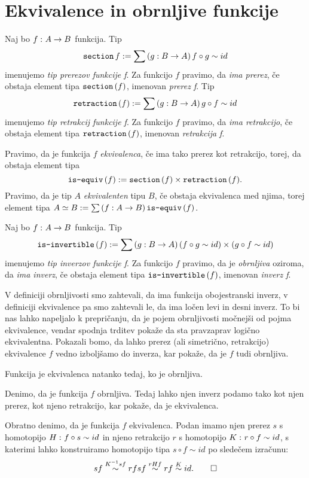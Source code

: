 \section{Ekvivalence in obrnljive funkcije}
\begin{definicija}
  Naj bo \(f \,\colon A \to B\) funkcija. Tip
  \[\textnormal{\texttt{section}}\, f := \sum \left( g : B \to A \right) f \circ g \sim id\]
  imenujemo \emph{tip prerezov funkcije f}. Za funkcijo \(f\) pravimo, da
  \emph{ima prerez}, če obstaja element tipa \(\textnormal{\texttt{section}}\,(f)\), imenovan \emph{prerez f}.
  Tip \[\textnormal{\texttt{retraction}}\,(f) := \sum \left( g : B \to A \right) g \circ f \sim id\] imenujemo
  \emph{tip retrakcij funkcije f}. Za funkcijo \(f\) pravimo, da \emph{ima retrakcijo}, če
  obstaja element tipa \(\textnormal{\texttt{retraction}}\,(f)\), imenovan \emph{retrakcija f}.
\end{definicija}

\begin{definicija}
  Pravimo, da je funkcija \(f\) \emph{ekvivalenca}, če ima tako prerez kot retrakcijo,
  torej, da obstaja element tipa \[\textnormal{\texttt{is-equiv}}\,(f) := \textnormal{\texttt{section}}\,(f) \times \textnormal{\texttt{retraction}}\,(f).\]
  Pravimo, da je tip \(A\) \emph{ekvivalenten} tipu \(B\), če obstaja ekvivalenca med
  njima, torej element tipa \(A \simeq B := \sum \left( f : A \to B \right) \textnormal{\texttt{is-equiv}}\,(f)\).
\end{definicija}

\begin{definicija}
  Naj bo \(f \,\colon A \to B\) funkcija. Tip
  \[\textnormal{\texttt{is-invertible}}\,(f) := \sum \left( g : B \to A \right) (f \circ g \sim id) \times (g \circ f \sim id)\]
  imenujemo \emph{tip inverzov funkcije f}. Za funkcijo \(f\) pravimo, da je
  \emph{obrnljiva} oziroma, da \emph{ima inverz}, če obstaja element tipa
  \(\textnormal{\texttt{is-invertible}}\,(f)\), imenovan \emph{inverz f}.
\end{definicija}

V definiciji obrnljivosti smo zahtevali, da ima funkcija obojestranski inverz, v
definiciji ekvivalence pa smo zahtevali le, da ima ločen levi in desni inverz.
To bi nas lahko
napeljalo k prepričanju, da je pojem obrnljivosti močnejši od pojma ekvivalence, vendar
spodnja trditev pokaže da sta pravzaprav logično ekvivalentna. Pokazali bomo, da lahko
prerez (ali simetrično, retrakcijo) ekvivalence \(f\) vedno izboljšamo do inverza,
kar pokaže, da je \(f\) tudi obrnljiva.

\begin{trditev}
  Funkcija je ekvivalenca natanko tedaj, ko je obrnljiva.
\end{trditev}

\begin{dokaz}
  Denimo, da je funkcija \(f\) obrnljiva. Tedaj lahko njen inverz podamo tako kot njen
  prerez, kot njeno retrakcijo, kar pokaže, da je ekvivalenca.

  Obratno denimo, da je funkcija \(f\) ekvivalenca. Podan imamo njen prerez \(s\) s
  homotopijo \(H \,\colon f \circ s \sim id\) in njeno retrakcijo \(r\) s homotopijo
  \(K \,\colon r \circ f \sim id\), s katerimi lahko konstruiramo homotopijo tipa
  \(s \circ f \sim id\) po sledečem izračunu:
  \[s f \overset{K^{-1}sf}{\sim} r f s f \overset{rHf}{\sim} r f \overset{K}{\sim} id. \qedhere\]
\end{dokaz}

